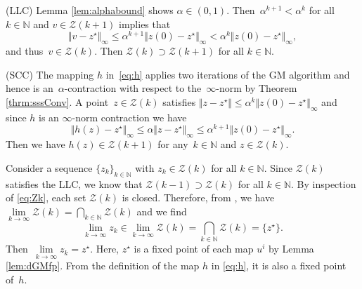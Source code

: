\documentclass[9pt,shortpaper,twoside,web]{ieeecolor}
\newcommand{\Z}{\ensuremath{\mathcal{Z}}\xspace}
\begin{document}
    (LLC) Lemma \ref{lem:alphabound} shows $\alpha\in(0,1)$. 
        Then~$\alpha^{k+1}< \alpha^k$ for all $k\in\mathbb N$ and
        $v \in \Z(k+1)$ implies that
        \begin{equation}
            \Vert v-z^\star\Vert_\infty\leq \alpha^{k+1}\Vert z(0)-z^\star\Vert_\infty  < \alpha^k\Vert z(0)-z^\star\Vert_\infty,
        \end{equation}
        and thus~$v \in \Z(k)$. 
        Then $\Z(k) \supset \Z(k+1)$ for all $k\in\mathbb N$.
        
        (SCC) %
        The mapping $h$ in~\eqref{eq:h} applies two iterations of the GM algorithm and 
        hence is an~$\alpha$-contraction with respect to the~$\infty$-norm by Theorem \ref{thrm:sssConv}. 
        A point~$z \in \Z(k)$ satisfies $\Vert z-z^\star\Vert\leq \alpha^k\Vert z(0)-z^\star\Vert_\infty$ and
        since $h$ is an $\infty$-norm contraction we have
        \begin{equation}
            \Vert h(z)-z^\star\Vert_\infty \leq \alpha\Vert z-z^\star\Vert_\infty \leq \alpha^{k+1}\Vert z(0)-z^\star\Vert_\infty.
        \end{equation}
        Then we have $h(z) \in \Z(k+1)$ for any~$k \in \mathbb{N}$ and $z \in \Z(k)$. 

        Consider a sequence $\{z_k\}_{k\in\mathbb N}$ with $z_k\in \Z(k)$ for all $k\in\mathbb{N}$.
        Since $\Z(k)$ satisfies the LLC, we know that $\Z(k-1)\supset\Z(k)$ for all $k\in\mathbb N$.
        By inspection of \eqref{eq:Zk}, each set $\Z(k)$ is closed.
        Therefore, from \cite{rockafellar2009variational}, we have $\lim\limits_{k\rightarrow\infty}\Z(k)=\bigcap_{k\in\mathbb N}\Z(k)$ and we find 
        \begin{equation}
            \lim_{k\rightarrow \infty}z_k\in \lim_{k\rightarrow \infty}\Z(k)= \bigcap_{k\in\mathbb N}\Z(k) = \{z^\star\}. 
        \end{equation}
        Then~$\lim\limits_{k\rightarrow\infty} z_k = z^\star$. 
        Here, $z^\star$ is a fixed point of each map $u^i$ by Lemma \ref{lem:dGMfp}. 
        From the definition of the map $h$ in \eqref{eq:h}, it is also a fixed point of~$h$. 
        
\end{document}

